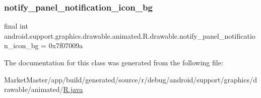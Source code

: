 \subsubsection{\texorpdfstring{notify\+\_\+panel\+\_\+notification\+\_\+icon\+\_\+bg}{notify\_panel\_notification\_icon\_bg}}
{\footnotesize\ttfamily final int android.\+support.\+graphics.\+drawable.\+animated.\+R.\+drawable.\+notify\+\_\+panel\+\_\+notification\+\_\+icon\+\_\+bg = 0x7f07009a\hspace{0.3cm}{\ttfamily [static]}}



The documentation for this class was generated from the following file\+:\begin{DoxyCompactItemize}
\item 
Market\+Master/app/build/generated/source/r/debug/android/support/graphics/drawable/animated/\mbox{\hyperlink{debug_2android_2support_2graphics_2drawable_2animated_2R_8java}{R.\+java}}\end{DoxyCompactItemize}
